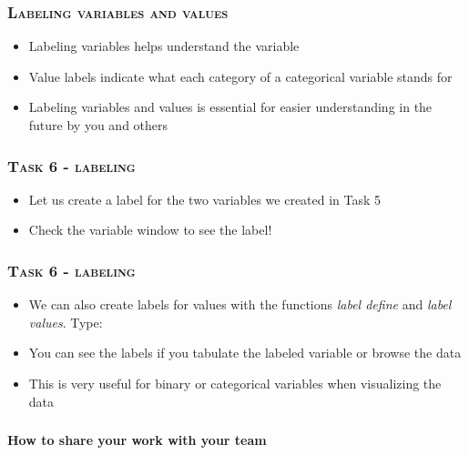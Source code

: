 \documentclass[10pt]{beamer}
\begin{document}
	\begin{frame}
		\frametitle{\textsc{Labeling variables and values}}
		\begin{itemize}	
			\item Labeling variables helps understand the variable 
			\item Value labels indicate what each category of a categorical variable stands for
			\item Labeling variables and values is essential for easier understanding in the future by you and others
		\end{itemize}
	\end{frame}
		
	\begin{frame}
		\frametitle{\textsc{Task 6 - labeling}}
		\begin{itemize}
			\item Let us create a label for the two variables we created in Task 5
		\end{itemize}
\begin{stlog}\end{stlog}
	
		\begin{itemize}
			\item Check the variable window to see the label!
		\end{itemize}		
	\end{frame}	
	

	\begin{frame}
		\frametitle{\textsc{Task 6 - labeling}}
		\begin{itemize}
		 	\item We can also create labels for values with the functions \textit{label define} and \textit{label values}. Type:
		\end{itemize}
\begin{stlog}\end{stlog}
	
		\begin{itemize}
	 		\item You can see the labels if you tabulate the labeled variable or browse the data
			\item This is very useful for binary or categorical variables when visualizing the data
		\end{itemize}		
	\end{frame}		
		
	\begin{frame}
		\frametitle{\textsc{}}

		\begin{center}
			\Large  \textbf{How to share your work with your team}
		\end{center}
	\end{frame}
\end{document}
